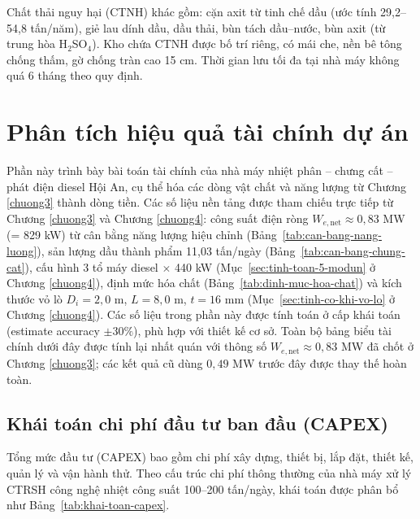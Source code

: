 \documentclass[../main.tex]{subfiles}
\begin{document}
Chất thải nguy hại (CTNH) khác gồm: cặn axit từ tinh chế dầu (ước tính 29,2--54,8 tấn/năm), giẻ lau dính dầu, dầu thải, bùn tách dầu--nước, bùn axit (từ trung hòa H$_2$SO$_4$). Kho chứa CTNH được bố trí riêng, có mái che, nền bê tông chống thấm, gờ chống tràn cao 15 cm. Thời gian lưu tối đa tại nhà máy không quá 6 tháng theo quy định.

\section{Phân tích hiệu quả tài chính dự án}
\label{sec:kinh-te}

Phần này trình bày bài toán tài chính của nhà máy nhiệt phân -- chưng cất -- phát điện diesel Hội An, cụ thể hóa các dòng vật chất và năng lượng từ Chương \ref{chuong3} thành dòng tiền. Các số liệu nền tảng được tham chiếu trực tiếp từ Chương \ref{chuong3} và Chương \ref{chuong4}: công suất điện ròng $W_{e,\text{net}} \approx 0{,}83$ MW (= 829 kW) từ cân bằng năng lượng hiệu chỉnh (Bảng~\ref{tab:can-bang-nang-luong}), sản lượng dầu thành phẩm 11,03 tấn/ngày (Bảng~\ref{tab:can-bang-chung-cat}), cấu hình 3 tổ máy diesel $\times$ 440 kW (Mục~\ref{sec:tinh-toan-5-modun} ở Chương \ref{chuong4}), định mức hóa chất (Bảng~\ref{tab:dinh-muc-hoa-chat}) và kích thước vỏ lò $D_i = 2{,}0$ m, $L = 8{,}0$ m, $t = 16$ mm (Mục~\ref{sec:tinh-co-khi-vo-lo} ở Chương \ref{chuong4}). Các số liệu trong phần này được tính toán ở cấp khái toán (estimate accuracy $\pm 30\%$), phù hợp với thiết kế cơ sở. Toàn bộ bảng biểu tài chính dưới đây được tính lại nhất quán với thông số $W_{e,\text{net}} \approx 0{,}83$ MW đã chốt ở Chương \ref{chuong3}; các kết quả cũ dùng $0{,}49$ MW trước đây được thay thế hoàn toàn.

\subsection{Khái toán chi phí đầu tư ban đầu (CAPEX)}

Tổng mức đầu tư (CAPEX) bao gồm chi phí xây dựng, thiết bị, lắp đặt, thiết kế, quản lý và vận hành thử. Theo cấu trúc chi phí thông thường của nhà máy xử lý CTRSH công nghệ nhiệt công suất 100--200 tấn/ngày, khái toán được phân bổ như Bảng~\ref{tab:khai-toan-capex}.
\end{document}
